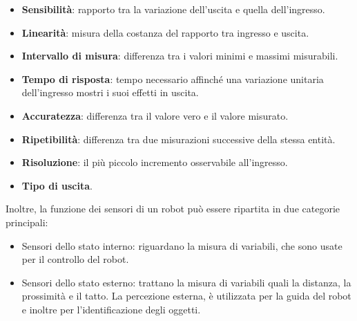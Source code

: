 \documentclass[a4paper,12pt,italian]{article}
\begin{document}
\begin{itemize}
	\item \textbf{Sensibilità}: rapporto tra la variazione dell’uscita e quella dell’ingresso.
	\item \textbf{Linearità}: misura della costanza del rapporto tra ingresso e uscita.
	\item \textbf{Intervallo di misura}: differenza tra i valori minimi e massimi misurabili. 
	\item \textbf{Tempo di risposta}: tempo necessario affinché una variazione unitaria dell’ingresso 
mostri i suoi effetti in uscita. 
	\item \textbf{Accuratezza}: differenza tra il valore vero e il valore misurato. 
	\item \textbf{Ripetibilità}: differenza tra due misurazioni successive della stessa entità. 
	\item \textbf{Risoluzione}: il più piccolo incremento osservabile all’ingresso. 
	\item \textbf{Tipo di uscita}. 
\end{itemize}

Inoltre, la funzione dei sensori di un robot può essere ripartita in due categorie principali: 
\begin{itemize}
	\item Sensori dello stato interno: riguardano la misura di variabili, che sono usate per il controllo del robot. 
	\item Sensori dello stato esterno: trattano la misura di variabili quali la distanza, la prossimità e il tatto. La percezione esterna, è utilizzata per la guida del robot e inoltre per l'identificazione degli oggetti. 
\end{itemize}
\end{document}
